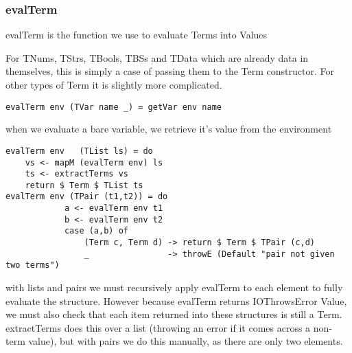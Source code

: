 \subsubsection{evalTerm}

evalTerm is the function we use to evaluate Terms into Values

For TNums, TStrs, TBools, TBSs and TData which are already data in themselves, this is simply a case of passing them to the Term constructor. For other types of Term it is slightly more complicated.
\begin{verbatim}
evalTerm env (TVar name _) = getVar env name
\end{verbatim}
when we evaluate a bare variable, we retrieve it's value from the environment

\begin{verbatim}
evalTerm env   (TList ls) = do
    vs <- mapM (evalTerm env) ls
    ts <- extractTerms vs
    return $ Term $ TList ts
evalTerm env (TPair (t1,t2)) = do
            a <- evalTerm env t1
            b <- evalTerm env t2
            case (a,b) of 
                (Term c, Term d) -> return $ Term $ TPair (c,d)
                _                -> throwE (Default "pair not given two terms")
\end{verbatim}
with lists and pairs we must recursively apply evalTerm to each element to fully evaluate the structure. However because evalTerm returns IOThrowsError Value, we must also check that each item returned into these structures is still a Term. extractTerms does this over a list (throwing an error if it comes across a non-term value), but with pairs we do this manually, as there are only two elements. 


